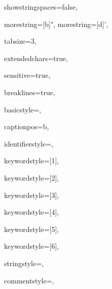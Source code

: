 {%


showstringspaces=false,

morestring=[b]",
morestring=[d]’,

tabsize=3,							

extendedchars=true,  		 		

sensitive=true, 

breaklines=true,

basicstyle=\ttfamily,

captionpos=b,							


identifierstyle={\ttfamily\color{black}},

keywordstyle=[1]{\ttfamily\color{dkviolet}},

keywordstyle=[2]{\ttfamily\color{dkgreen}},

keywordstyle=[3]{\ttfamily\color{lightblue}},

keywordstyle=[4]{\ttfamily\color{dkblue}},

keywordstyle=[5]{\ttfamily\color{red}},


keywordstyle=[6]{\ttfamily\color{dkviolet}},

stringstyle=\ttfamily,

commentstyle=\rmfamily,

}


